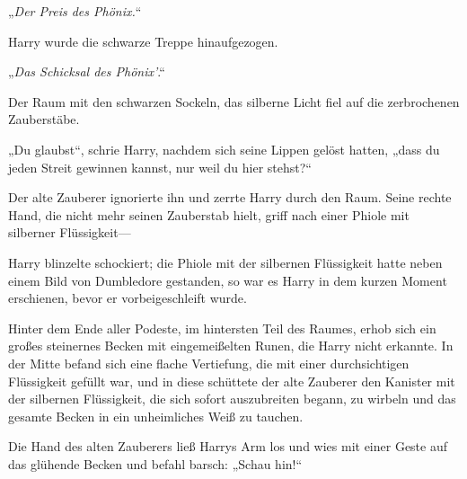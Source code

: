 „\emph{Der Preis des Phönix.}“

Harry wurde die schwarze Treppe hinaufgezogen.

„\emph{Das Schicksal des Phönix'}.“

Der Raum mit den schwarzen Sockeln, das silberne Licht fiel auf die zerbrochenen Zauberstäbe.

„Du glaubst“, schrie Harry, nachdem sich seine Lippen gelöst hatten, „dass du jeden Streit gewinnen kannst, nur weil du hier stehst?“

Der alte Zauberer ignorierte ihn und zerrte Harry durch den Raum. Seine rechte Hand, die nicht mehr seinen Zauberstab hielt, griff nach einer Phiole mit silberner Flüssigkeit—

Harry blinzelte schockiert; die Phiole mit der silbernen Flüssigkeit hatte neben einem Bild von Dumbledore gestanden, so war es Harry in dem kurzen Moment erschienen, bevor er vorbeigeschleift wurde.

Hinter dem Ende aller Podeste, im hintersten Teil des Raumes, erhob sich ein großes steinernes Becken mit eingemeißelten Runen, die Harry nicht erkannte. In der Mitte befand sich eine flache Vertiefung, die mit einer durchsichtigen Flüssigkeit gefüllt war, und in diese schüttete der alte Zauberer den Kanister mit der silbernen Flüssigkeit, die sich sofort auszubreiten begann, zu wirbeln und das gesamte Becken in ein unheimliches Weiß zu tauchen.

Die Hand des alten Zauberers ließ Harrys Arm los und wies mit einer Geste auf das glühende Becken und befahl barsch: „Schau hin!“

